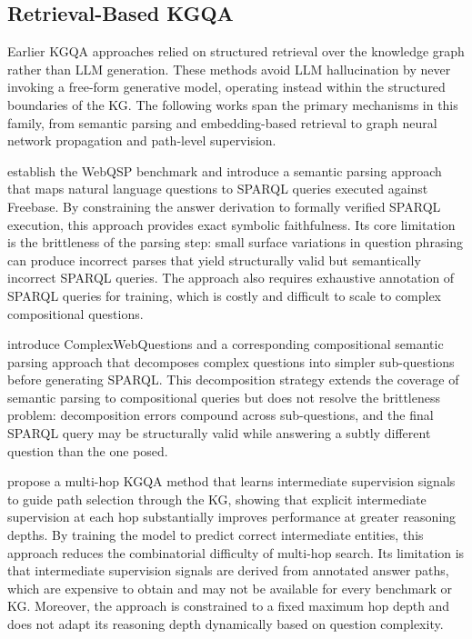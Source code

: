 \subsection{Retrieval-Based KGQA}

Earlier KGQA approaches relied on structured retrieval over the knowledge graph rather than LLM generation. These methods avoid LLM hallucination by never invoking a free-form generative model, operating instead within the structured boundaries of the KG. The following works span the primary mechanisms in this family, from semantic parsing and embedding-based retrieval to graph neural network propagation and path-level supervision.

\citet{yih2016websqp} establish the WebQSP benchmark and introduce a semantic parsing approach that maps natural language questions to SPARQL queries executed against Freebase. By constraining the answer derivation to formally verified SPARQL execution, this approach provides exact symbolic faithfulness. Its core limitation is the brittleness of the parsing step: small surface variations in question phrasing can produce incorrect parses that yield structurally valid but semantically incorrect SPARQL queries. The approach also requires exhaustive annotation of SPARQL queries for training, which is costly and difficult to scale to complex compositional questions.

\citet{talmor2018cwq} introduce ComplexWebQuestions and a corresponding compositional semantic parsing approach that decomposes complex questions into simpler sub-questions before generating SPARQL. This decomposition strategy extends the coverage of semantic parsing to compositional queries but does not resolve the brittleness problem: decomposition errors compound across sub-questions, and the final SPARQL query may be structurally valid while answering a subtly different question than the one posed.

\citet{he2021multihop} propose a multi-hop KGQA method that learns intermediate supervision signals to guide path selection through the KG, showing that explicit intermediate supervision at each hop substantially improves performance at greater reasoning depths. By training the model to predict correct intermediate entities, this approach reduces the combinatorial difficulty of multi-hop search. Its limitation is that intermediate supervision signals are derived from annotated answer paths, which are expensive to obtain and may not be available for every benchmark or KG. Moreover, the approach is constrained to a fixed maximum hop depth and does not adapt its reasoning depth dynamically based on question complexity.

